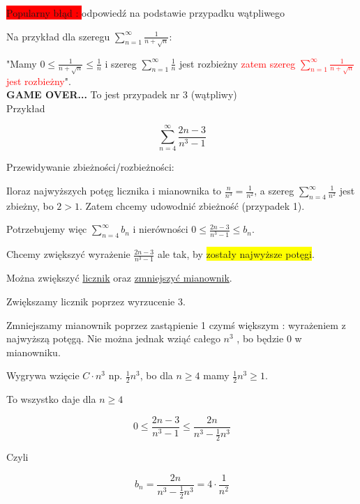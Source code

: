 \documentclass[12pt]{article}
\begin{document}
\colorbox{red}{Popularny błąd : } odpowiedź na podstawie przypadku wątpliwego

Na przykład dla szeregu $ \sum\limits_{n = 1}^{\infty} \frac{1}{n + \sqrt{n}} : $

"Mamy $ 0 \leq \frac{1}{n + \sqrt{n}} \leq \frac{1}{n} $ i szereg $ \sum\limits_{n = 1}^{\infty} \frac{1}{n} $
jest rozbieżny \textcolor{red}{zatem szereg $\sum\limits_{n = 1}^{\infty} \frac{1}{n + \sqrt{n}}$ jest rozbieżny}". \\

\textbf{GAME OVER...} To jest przypadek nr 3 (wątpliwy) \\

Przykład

$$ \sum\limits_{n = 4}^{\infty} \frac{2n - 3}{n^3 - 1} $$

Przewidywanie zbieżności/rozbieżności:

Iloraz najwyższych potęg licznika i mianownika to $ \frac{n}{n^3} = \frac{1}{n^2} $, a szereg $ \sum\limits_{n = 4}^{\infty} \frac{1}{n^2} $
jest zbieżny, bo $ 2 > 1 $. Zatem chcemy udowodnić zbieżność (przypadek 1).

Potrzebujemy więc $ \sum\limits_{n = 4}^{\infty} b_n $ i nierówności $ 0 \leq \frac{2n - 3}{n^3 - 1} \leq b_n $.

Chcemy zwiększyć wyrażenie $ \frac{2n - 3}{n^3 - 1} $ ale tak, by \colorbox{yellow}{zostały najwyższe potęgi}.

Można zwiększyć \underline{licznik} oraz \underline{zmniejszyć mianownik}.

Zwiększamy licznik poprzez wyrzucenie 3.

Zmniejszamy mianownik poprzez zastąpienie 1 czymś większym : wyrażeniem z najwyższą potęgą. Nie można jednak wziąć całego $n^3$
, bo będzie 0 w mianowniku.

Wygrywa wzięcie $ C \cdot n^3 $ np. $ \frac{1}{2} n^3 $, bo dla $ n \geq 4 $ mamy $ \frac{1}{2} n^3 \geq 1 $.

To wszystko daje dla $ n \geq 4 $

$$ 0 \leq \frac{2n - 3}{n^3 - 1} \leq \frac{2n}{n^3 - \frac{1}{2} n^3} $$

Czyli

$$ b_n = \frac{2n}{n^3 - \frac{1}{2}n^3} = 4 \cdot \frac{1}{n^2} $$
\end{document}
